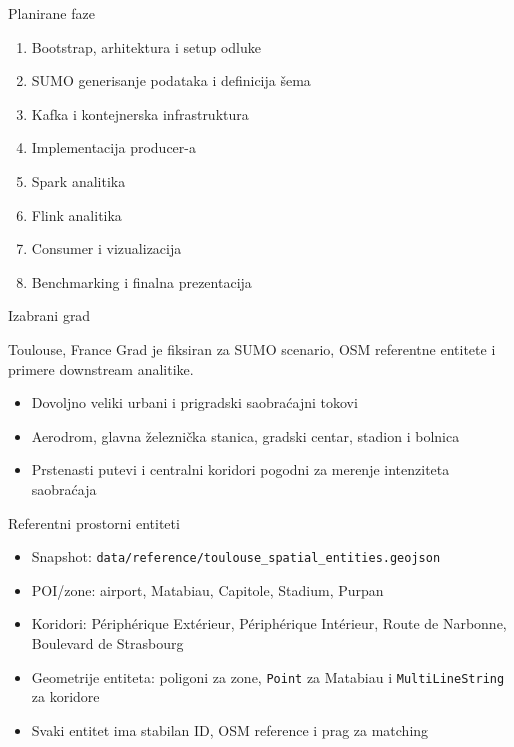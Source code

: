\documentclass[aspectratio=169,11pt]{beamer}
\newcommand{\code}[1]{\texttt{\small #1}}
\begin{document}
\begin{frame}{Planirane faze}
  \begin{enumerate}
    \item Bootstrap, arhitektura i setup odluke
    \item SUMO generisanje podataka i definicija šema
    \item Kafka i kontejnerska infrastruktura
    \item Implementacija producer-a
    \item Spark analitika
    \item Flink analitika
    \item Consumer i vizualizacija
    \item Benchmarking i finalna prezentacija
  \end{enumerate}
\end{frame}

\begin{frame}{Izabrani grad}
  \begin{block}{Toulouse, France}
    Grad je fiksiran za SUMO scenario, OSM referentne entitete i primere downstream analitike.
  \end{block}

  \begin{itemize}
    \item Dovoljno veliki urbani i prigradski saobraćajni tokovi
    \item Aerodrom, glavna železnička stanica, gradski centar, stadion i bolnica
    \item Prstenasti putevi i centralni koridori pogodni za merenje intenziteta saobraćaja
  \end{itemize}
\end{frame}

\begin{frame}{Referentni prostorni entiteti}
  \begin{itemize}
    \item Snapshot: \code{data/reference/toulouse\_spatial\_entities.geojson}
    \item POI/zone: airport, Matabiau, Capitole, Stadium, Purpan
    \item Koridori: Périphérique Extérieur, Périphérique Intérieur, Route de Narbonne, Boulevard de Strasbourg
    \item Geometrije entiteta: poligoni za zone, \code{Point} za Matabiau i \code{MultiLineString} za koridore
    \item Svaki entitet ima stabilan ID, OSM reference i prag za matching
  \end{itemize}
\end{frame}
\end{document}
